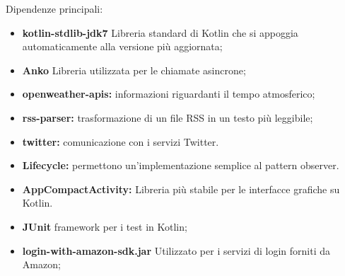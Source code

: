 Dipendenze principali:
\begin{itemize}
	\item \textbf {kotlin-stdlib-jdk7} Libreria standard di Kotlin che si appoggia automaticamente alla versione più aggiornata;
	\item \textbf {Anko} Libreria utilizzata per le chiamate asincrone;
	\item \textbf{openweather-apis:} informazioni riguardanti il tempo atmosferico;
	\item \textbf{rss-parser:} trasformazione di un file RSS in un testo più leggibile;
	\item \textbf{twitter:} comunicazione con i servizi Twitter.
	\item \textbf{Lifecycle:} permettono un'implementazione semplice al pattern observer.
	\item \textbf{AppCompactActivity:} Libreria più stabile per le interfacce grafiche su Kotlin.
	\item \textbf{JUnit} framework per i test in Kotlin;
	\item \textbf{login-with-amazon-sdk.jar} Utilizzato per i servizi di login forniti da Amazon;
\end{itemize}
